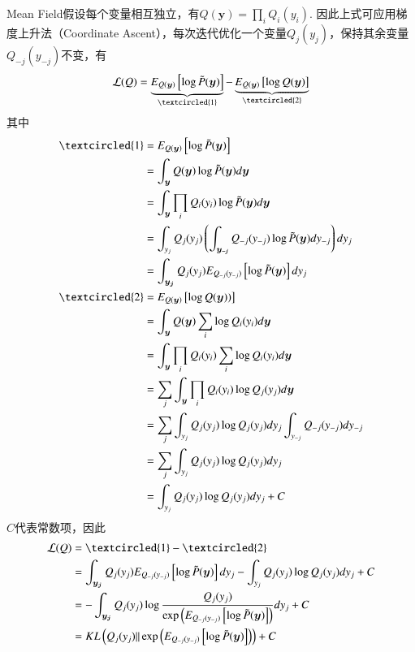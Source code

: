 Mean Field假设每个变量相互独立，有$Q(\boldsymbol{y})=\prod_i{Q_i(y_i)}$. 因此上式可应用梯度上升法（Coordinate Ascent），每次迭代优化一个变量$Q_j(y_j)$，保持其余变量$Q_{-j}(y_{-j})$不变，有
\begin{equation}
  \mathcal{L}(Q)=\underbrace{E_{Q(\boldsymbol{y})}\left[\log \tilde{P}(\boldsymbol{y})\right]}_{\textcircled{1}}-\underbrace{E_{Q(\boldsymbol{y})}\left[\log Q(\boldsymbol{y})\right]}_{\textcircled{2}}
\end{equation}
其中
\begin{equation}
  \begin{split}
    \textcircled{1}&=E_{Q(\boldsymbol{y})}\left[\log \tilde{ P}(\boldsymbol{y})\right]\\
    &=\int_{\boldsymbol{y}}Q(\boldsymbol{y}) \log \tilde{P}(\boldsymbol{y})d\boldsymbol{y}\\
    &=\int_{\boldsymbol{y}}\prod_i{Q_i(y_i)} \log \tilde{P}(\boldsymbol{y})d\boldsymbol{y}\\
    &=\int_{y_j}Q_j(y_j)\left(\int_{\boldsymbol{y_{-j}}}Q_{-j}(y_{-j})\log \tilde{ P}(\boldsymbol{y}) dy_{-j}\right) dy_j\\
    &=\int_{\boldsymbol{y_j}}Q_j(y_j)E_{Q_{-j}(y_{-j})}\left[\log \tilde{ P}(\boldsymbol{y}) \right] dy_j\\
    \textcircled{2}&=E_{Q(\boldsymbol{y})}\left[\log Q(\boldsymbol{y}))\right]\\
    &=\int_{\boldsymbol{y}}Q(\boldsymbol{y}) \sum_i\log Q_i(y_i) d\boldsymbol{y}\\
    &=\int_{\boldsymbol{y}}\prod_i{Q_i(y_i)} \sum_i\log Q_i(y_i) d\boldsymbol{y}\\
    &=\sum_j\int_{\boldsymbol{y}}\prod_i{Q_i(y_i)}\log Q_j(y_j) d\boldsymbol{y}\\
    &=\sum_j\int_{y_j}Q_j(y_j)\log Q_j(y_j) dy_j\int_{y_{-j}} {Q_{-j}(y_{-j})}dy_{-j}\\
    &=\sum_j\int_{y_j}Q_j(y_j)\log Q_j(y_j) dy_j\\
    &=\int_{y_j}Q_j(y_j)\log Q_j(y_j) dy_j + C
  \end{split}
\end{equation}
$C$代表常数项，因此
\begin{equation}
  \begin{split}
    \mathcal{L}(Q)&=\textcircled{1}-\textcircled{2}\\
    &=\int_{\boldsymbol{y_j}}Q_j(y_j)E_{Q_{-j}(y_{-j})}\left[\log \tilde{P}(\boldsymbol{y}) \right] dy_j-\int_{y_j}Q_j(y_j)\log Q_j(y_j) dy_j +C\\
    &=-\int_{\boldsymbol{y_j}}Q_j(y_j)\log\frac{Q_j(y_j)}{\exp\left(E_{Q_{-j}(y_{-j})}\left[\log \tilde{P}(\boldsymbol{y}) \right]\right)} dy_j +C\\
    &=KL\left(Q_j(y_j)\|\exp\left(E_{Q_{-j}(y_{-j})}\left[\log \tilde{P}(\boldsymbol{y}) \right]\right)\right)+C
  \end{split}
\end{equation}
